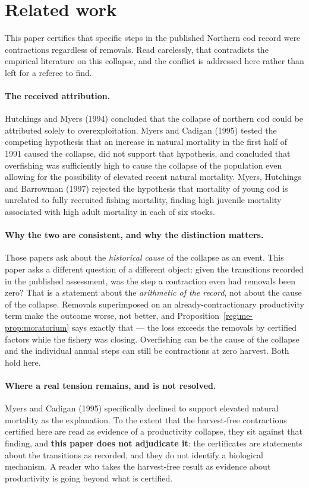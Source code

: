 \section{Related work}
\label{regime-priorart}

This paper certifies that specific steps in the published Northern cod record were
contractions regardless of removals. Read carelessly, that contradicts the empirical
literature on this collapse, and the conflict is addressed here rather than left for a
referee to find.

\paragraph{The received attribution.} Hutchings and Myers (1994) concluded that the collapse
of northern cod could be attributed solely to overexploitation. Myers and Cadigan (1995)
tested the competing hypothesis that an increase in natural mortality in the first half of
1991 caused the collapse, did not support that hypothesis, and concluded that overfishing was
sufficiently high to cause the collapse of the population even allowing for the possibility
of elevated recent natural mortality. Myers, Hutchings and Barrowman (1997) rejected the
hypothesis that mortality of young cod is unrelated to fully recruited fishing mortality,
finding high juvenile mortality associated with high adult mortality in each of six stocks.

\paragraph{Why the two are consistent, and why the distinction matters.} Those papers ask
about the \emph{historical cause} of the collapse as an event. This paper asks a different
question of a different object: given the transitions recorded in the published assessment,
was the step a contraction even had removals been zero? That is a statement about the
\emph{arithmetic of the record}, not about the cause of the collapse. Removals superimposed
on an already-contractionary productivity term make the outcome worse, not better, and
Proposition~\ref{regime-prop:moratorium} says exactly that --- the loss exceeds the removals by
certified factors while the fishery was closing. Overfishing can be the cause of the collapse
and the individual annual steps can still be contractions at zero harvest. Both hold here.

\paragraph{Where a real tension remains, and is not resolved.} Myers and Cadigan (1995)
specifically declined to support elevated natural mortality as the explanation. To the extent
that the harvest-free contractions certified here are read as evidence of a productivity
collapse, they sit against that finding, and \textbf{this paper does not adjudicate it}: the
certificates are statements about the transitions as recorded, and they do not identify a
biological mechanism. A reader who takes the harvest-free result as evidence about
productivity is going beyond what is certified.

